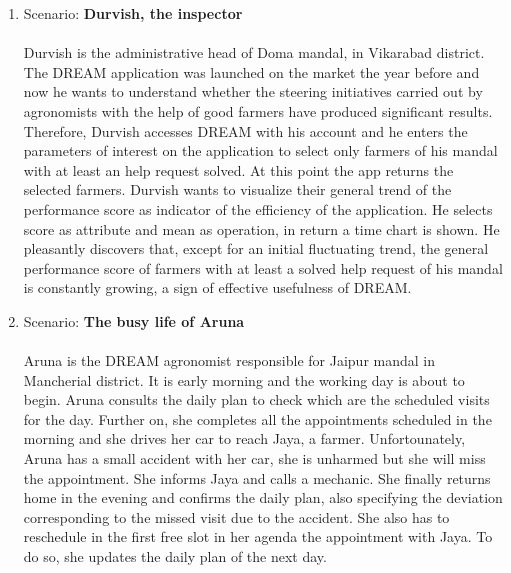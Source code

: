 \begin{enumerate}
\item Scenario: \textbf{Durvish, the inspector}\\\\
Durvish is the administrative head of Doma mandal, in Vikarabad district. The DREAM application was launched on the market the year before and now he wants to understand whether the steering initiatives carried out by agronomists with the help of good farmers have produced significant results. Therefore, Durvish accesses DREAM with his account and he enters the parameters of interest on the application to select only farmers of his mandal with at least an help request solved.
At this point the app returns the selected farmers. Durvish wants to visualize their general trend of the performance score as indicator of the efficiency of the application. He selects score as attribute and mean as operation, in return a time chart is shown. He pleasantly discovers that, except for an initial fluctuating trend, the general performance score of farmers with at least a solved help request of his mandal is constantly growing, a sign of effective usefulness of DREAM.
\\



\item Scenario: \textbf{The busy life of Aruna}\\\\
Aruna is the DREAM agronomist responsible for Jaipur mandal in Mancherial district. It is early morning and the working day is about to begin. Aruna consults the daily plan to check which are the scheduled visits for the day. Further on, she completes all the appointments scheduled in the morning and she drives her car to reach Jaya, a farmer. Unfortounately, Aruna has a small accident with her car, she is unharmed but she will miss the appointment. She informs Jaya and calls a mechanic. She finally returns home in the evening and confirms the daily plan, also specifying the deviation corresponding to the missed visit due to the accident. She also has to reschedule in the first free slot in her agenda the appointment with Jaya. To do so, she updates the daily plan of the next day. 
\\





\end{enumerate}
